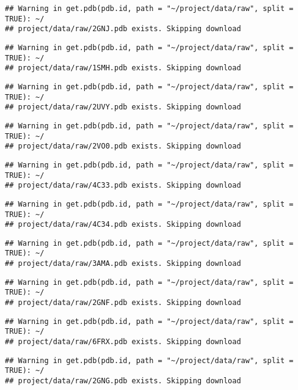 \documentclass[
]{article}
\begin{document}
\begin{verbatim}
## Warning in get.pdb(pdb.id, path = "~/project/data/raw", split = TRUE): ~/
## project/data/raw/2GNJ.pdb exists. Skipping download
\end{verbatim}

\begin{verbatim}
## Warning in get.pdb(pdb.id, path = "~/project/data/raw", split = TRUE): ~/
## project/data/raw/1SMH.pdb exists. Skipping download
\end{verbatim}

\begin{verbatim}
## Warning in get.pdb(pdb.id, path = "~/project/data/raw", split = TRUE): ~/
## project/data/raw/2UVY.pdb exists. Skipping download
\end{verbatim}

\begin{verbatim}
## Warning in get.pdb(pdb.id, path = "~/project/data/raw", split = TRUE): ~/
## project/data/raw/2VO0.pdb exists. Skipping download
\end{verbatim}

\begin{verbatim}
## Warning in get.pdb(pdb.id, path = "~/project/data/raw", split = TRUE): ~/
## project/data/raw/4C33.pdb exists. Skipping download
\end{verbatim}

\begin{verbatim}
## Warning in get.pdb(pdb.id, path = "~/project/data/raw", split = TRUE): ~/
## project/data/raw/4C34.pdb exists. Skipping download
\end{verbatim}

\begin{verbatim}
## Warning in get.pdb(pdb.id, path = "~/project/data/raw", split = TRUE): ~/
## project/data/raw/3AMA.pdb exists. Skipping download
\end{verbatim}

\begin{verbatim}
## Warning in get.pdb(pdb.id, path = "~/project/data/raw", split = TRUE): ~/
## project/data/raw/2GNF.pdb exists. Skipping download
\end{verbatim}

\begin{verbatim}
## Warning in get.pdb(pdb.id, path = "~/project/data/raw", split = TRUE): ~/
## project/data/raw/6FRX.pdb exists. Skipping download
\end{verbatim}

\begin{verbatim}
## Warning in get.pdb(pdb.id, path = "~/project/data/raw", split = TRUE): ~/
## project/data/raw/2GNG.pdb exists. Skipping download
\end{verbatim}
\end{document}
